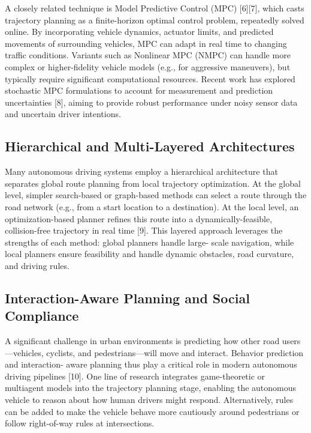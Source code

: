 A closely related technique is Model Predictive Control (MPC) [6][7], which casts trajectory planning as a finite-horizon optimal control problem,
repeatedly solved online.
By incorporating vehicle dynamics, actuator limits, and predicted movements of surrounding vehicles, MPC can adapt in real time to changing traffic
conditions.
Variants such as Nonlinear MPC (NMPC) can handle more complex or higher-fidelity vehicle models (e.g., for aggressive maneuvers), but typically
require significant computational resources.
Recent work has explored stochastic MPC formulations to account for measurement and prediction uncertainties [8], aiming to provide robust
performance under noisy sensor data and uncertain driver intentions.

\subsection{Hierarchical and Multi-Layered Architectures}

Many autonomous driving systems employ a hierarchical architecture that separates global route planning from local trajectory optimization.
At the global level, simpler search-based or graph-based methods can select a route through the road network (e.g., from a start location to a
destination).
At the local level, an optimization-based planner refines this route into a dynamically-feasible, collision-free trajectory in real time [9].
This layered approach leverages the strengths of each method: global planners handle large- scale navigation, while local planners ensure feasibility
and handle dynamic obstacles, road curvature, and driving rules.

\subsection{Interaction-Aware Planning and Social Compliance}
A significant challenge in urban environments is predicting how other road users—vehicles, cyclists, and pedestrians—will move and interact.
Behavior prediction and interaction- aware planning thus play a critical role in modern autonomous driving pipelines [10].
One line of research integrates game-theoretic or multiagent models into the trajectory planning stage, enabling the autonomous vehicle to reason
about how human drivers might respond.
Alternatively, rules can be added to make the vehicle behave more cautiously around pedestrians or follow right-of-way rules at intersections.

